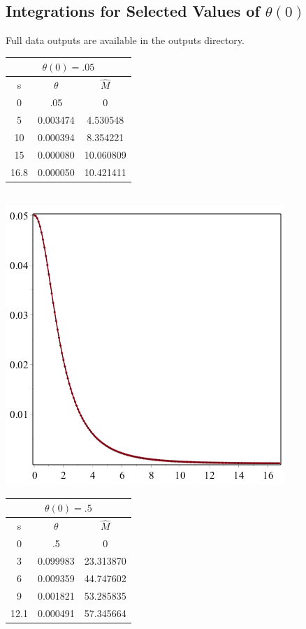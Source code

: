 \documentclass[11pt]{article} %
\begin{document}
\subsection*{Integrations for Selected Values of $\theta(0)$}
Full data outputs are available in the outputs directory.
\begin{tabular}{ | c c c |}

\multicolumn{3}{c}{ $\theta(0) = .05$ } \\
\hline
s & $\theta$ & $\hat M$\\
\hline
0 & .05 & 0 \\
5 & 0.003474 & 4.530548\\
10 & 0.000394 &8.354221 \\
15 & 0.000080& 10.060809 \\
16.8 & 0.000050& 10.421411\\
\hline
\end{tabular}\\
\includegraphics[scale=.5]{plots/wd1.png}\\
\begin{tabular}{ | c c c |}
\multicolumn{3}{c}{ $\theta(0) = .5$ } \\
\hline
s & $\theta$ & $\hat M$\\
\hline
0 & .5 & 0\\
3 &0.099983 & 23.313870 \\
6 & 0.009359& 44.747602\\
9 & 0.001821& 53.285835\\
12.1 & 0.000491 & 57.345664\\
\hline
\end{tabular}\\
\end{document}
